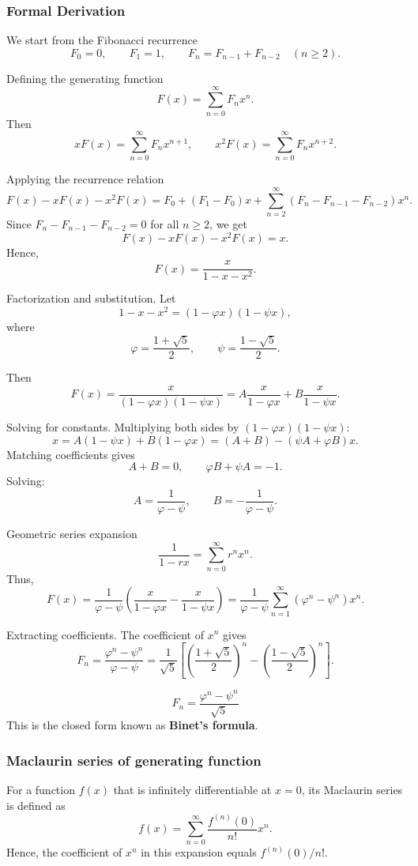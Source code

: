 \documentclass{article}
\begin{document}
\subsubsection{Formal Derivation}

We start from the Fibonacci recurrence
\[
F_0 = 0, \qquad F_1 = 1, \qquad F_n = F_{n-1} + F_{n-2} \quad (n \ge 2).
\]

Defining the generating function
\[
F(x) = \sum_{n=0}^{\infty} F_n x^n.
\]
Then
\[
xF(x) = \sum_{n=0}^{\infty} F_n x^{n+1}, \qquad
x^2F(x) = \sum_{n=0}^{\infty} F_n x^{n+2}.
\]

Applying the recurrence relation
\[
F(x) - xF(x) - x^2F(x)
= F_0 + (F_1 - F_0)x + \sum_{n=2}^{\infty}(F_n - F_{n-1} - F_{n-2})x^n.
\]
Since $F_n - F_{n-1} - F_{n-2} = 0$ for all $n \ge 2$, we get
\[
F(x) - xF(x) - x^2F(x) = x.
\]
Hence,
\[
F(x) = \frac{x}{1 - x - x^2}.
\]

Factorization and substitution.
Let
\[
1 - x - x^2 = (1 - \varphi x)(1 - \psi x),
\]
where
\[
\varphi = \frac{1+\sqrt{5}}{2}, \qquad
\psi = \frac{1-\sqrt{5}}{2}.
\]

Then
\[
F(x) = \frac{x}{(1 - \varphi x)(1 - \psi x)}
= A\frac{x}{1 - \varphi x} + B\frac{x}{1 - \psi x}.
\]

Solving for constants.
Multiplying both sides by $(1 - \varphi x)(1 - \psi x)$:
\[
x = A(1 - \psi x) + B(1 - \varphi x)
= (A + B) - (\psi A + \varphi B)x.
\]
Matching coefficients gives
\[
A + B = 0, \qquad \varphi B + \psi A = -1.
\]
Solving:
\[
A = \frac{1}{\varphi - \psi}, \qquad B = -\frac{1}{\varphi - \psi}.
\]

Geometric series expansion
\[
\frac{1}{1 - r x} = \sum_{n=0}^{\infty} r^n x^n.
\]
Thus,
\[
F(x)
= \frac{1}{\varphi - \psi}
\left(
\frac{x}{1 - \varphi x} - \frac{x}{1 - \psi x}
\right)
= \frac{1}{\varphi - \psi}
\sum_{n=1}^{\infty} (\varphi^n - \psi^n)x^n.
\]

Extracting coefficients.
The coefficient of $x^n$ gives
\[
F_n = \frac{\varphi^n - \psi^n}{\varphi - \psi}
= \frac{1}{\sqrt{5}}
\left[
\left(\frac{1+\sqrt{5}}{2}\right)^n
- \left(\frac{1-\sqrt{5}}{2}\right)^n
\right].
\]

\[
\boxed{
	F_n = \frac{\varphi^n - \psi^n}{\sqrt{5}}
}
\]
This is the closed form known as \textbf{Binet's formula}.

\subsubsection{Maclaurin series of generating function}
	For a function \( f(x) \) that is infinitely differentiable at \( x=0 \),
its Maclaurin series is defined as
\[
f(x) = \sum_{n=0}^{\infty} \frac{f^{(n)}(0)}{n!} x^n.
\]
Hence, the coefficient of \(x^n\) in this expansion equals \( f^{(n)}(0)/n! \).
\end{document}
